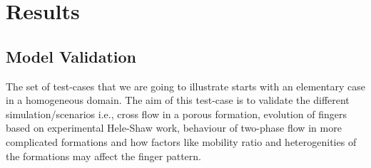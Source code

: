 \documentclass[preprint,authoryear,12pt]{elsarticle}
\begin{document}


\pagebreak
\clearpage

%

\pagebreak
\clearpage



 

\pagebreak
\clearpage

\pagebreak
\clearpage
%
%

\section{Results}\label{section:results}

\subsection{Model Validation}

The set of test-cases that we are going to illustrate starts with an elementary case in a homogeneous domain. The aim of this test-case is to validate the different simulation/scenarios i.e., cross flow in a porous formation, evolution of fingers based on experimental Hele-Shaw work, behaviour of two-phase flow in more complicated formations and how factors like mobility ratio and heterogenities of the formations may affect the finger pattern. 
\end{document}
